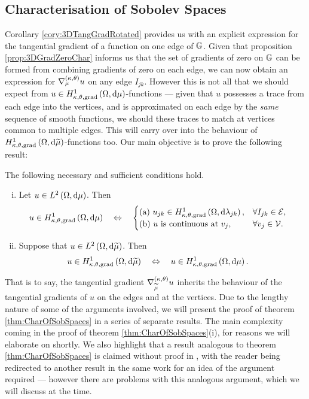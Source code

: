 \subsection{Characterisation of Sobolev Spaces}
Corollary \ref{cory:3DTangGradRotated} provides us with an explicit expression for the tangential gradient of a function on one edge of $\mathbb{G}$.
Given that proposition \ref{prop:3DGradZeroChar} informs us that the set of gradients of zero on $\mathbb{G}$ can be formed from combining gradients of zero on each edge, we can now obtain an expression for $\nabla^{\left( \kappa, \theta \right)}_{\mu}u$ on any edge $I_{jk}$.
However this is not all that we should expect from $u\in H^1_{\kappa,\theta,\mathrm{grad}}\left( \Omega, \mathrm{d}\mu \right)$-functions --- given that $u$ possesses a trace from each edge into the vertices, and is approximated on each edge by the \emph{same} sequence of smooth functions, we should these traces to match at vertices common to multiple edges.
This will carry over into the behaviour of $H^1_{\kappa,\theta,\mathrm{grad}}\left( \Omega, \mathrm{d}\widetilde{\mu} \right)$-functions too.
Our main objective is to prove the following result:
\begin{theorem} \label{thm:CharOfSobSpaces}
	The following necessary and sufficient conditions hold.
	\begin{enumerate}[(i)]
		\item Let $u\in L^{2}\left( \Omega,\mathrm{d} \mu \right)$.
		Then
		\begin{align}
			u\in H^1_{\kappa,\theta,\mathrm{grad}}\left( \Omega, \mathrm{d}\mu \right) 
			&\quad\Leftrightarrow\quad 
			\begin{cases} 
				\mathrm{(a)} \ u_{jk}\in H^1_{\kappa,\theta,\mathrm{grad}}\left( \Omega, \mathrm{d}\lambda_{jk} \right), & \forall I_{jk}\in\mathcal{E}, \\
				\mathrm{(b)} \ u \text{ is continuous at } v_j, & \forall v_j\in\mathcal{V}.
			\end{cases}
		\end{align}
		\item Suppose that $u\in L^{2}\left( \Omega,\mathrm{d} \widetilde{\mu} \right)$.
		Then
		\begin{align*}
			u\in H^1_{\kappa,\theta,\mathrm{grad}}\left( \Omega, \mathrm{d}\widetilde{\mu} \right) 
			&\quad\Leftrightarrow\quad 
			u\in H^1_{\kappa,\theta,\mathrm{grad}}\left( \Omega, \mathrm{d}\mu \right).	
		\end{align*}
	\end{enumerate}
\end{theorem}
That is to say, the tangential gradient $\nabla^{\left( \kappa, \theta \right)}_{\widetilde{\mu}}u$ inherits the behaviour of the tangential gradients of $u$ on the edges and at the vertices.
Due to the lengthy nature of some of the arguments involved, we will present the proof of theorem \ref{thm:CharOfSobSpaces} in a series of separate results.
The main complexity coming in the proof of theorem \ref{thm:CharOfSobSpaces}(i), for reasons we will elaborate on shortly.
We also highlight that a result analogous to theorem \ref{thm:CharOfSobSpaces} is claimed without proof in \cite{zhikov2002homogenization}, with the reader being redirected to another result in the same work for an idea of the argument required --- however there are problems with this analogous argument, which we will discuss at the time.

